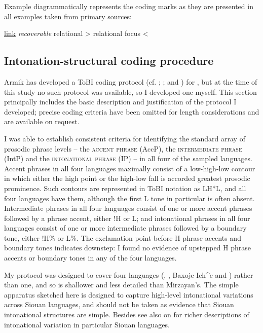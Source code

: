 \documentclass[output=paper]{LSP/langsci}
\begin{document}
Example  diagrammatically represents the coding marks as they are presented in all examples taken from primary sources:

\ea\label{codingsummary}{\underline{link} \textit{recoverable} relational  > relational focus <}\z

\subsection{Intonation-structural coding procedure}\label{intonationcoding}

Armik \citet{Mirzayan2011} has developed a ToBI coding protocol (cf. \citealt{Pierrehumbert1980}; \citealt{BeckmanPierrehumbert1986}; and \citealt{PierrehumbertHirschberg1990}) for , but at the time of this study no such protocol was available, so I developed one myself. This section principally includes the basic description and justification of the protocol I developed; precise coding criteria have been omitted for length considerations and are available on request. 

I was able to establish consistent criteria for identifying the standard array of prosodic phrase levels -- the \textsc{accent phrase} (AccP), the \textsc{intermediate phrase} (IntP) and the \textsc{intonational phrase} (IP) -- in all four of the sampled languages. Accent phrases in all four languages maximally consist of a low-high-low contour in which either the high point or the high-low fall is accorded greatest prosodic prominence. Such contours are represented in ToBI notation as LH*L, and all four languages have them, although the first L tone in particular is often absent. Intermediate phrases in all four languages consist of one or more accent phrases followed by a phrase accent, either !H or L; and intonational phrases in all four languages consist of one or more intermediate phrases followed by a boundary tone, either !H\% or L\%. The exclamation point before H phrase accents and boundary tones indicates downstep: I found no evidence of upstepped H phrase accents or boundary tones in any of the four languages. 

My protocol was designed to cover four languages (, , Baxoje Ich\^{}e and ) rather than one, and so is shallower and less detailed than Mirzayan’s. The simple apparatus sketched here is designed to capture high-level intonational variations across Siouan languages, and should not be taken as evidence that Siouan intonational structures are simple. Besides \citet{Mirzayan2011} see also \citet{Larson2009} on  for richer descriptions of intonational variation in particular Siouan languages. 
\end{document}

